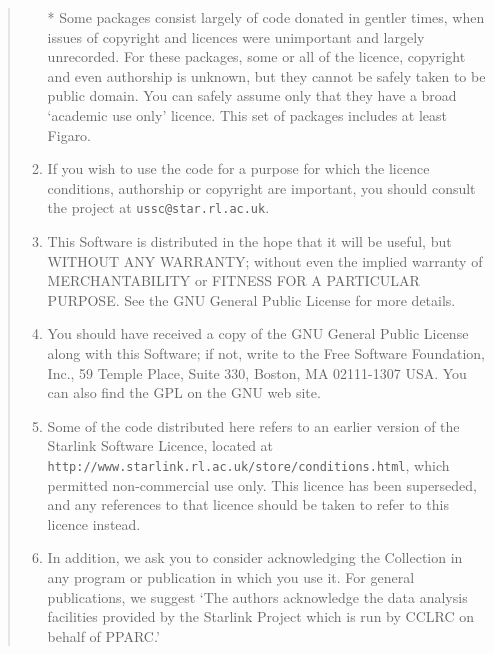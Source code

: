 \documentclass[twoside,11pt]{article}
\newcommand{\htmladdnormallink}[2]{#1}
\renewcommand{\_}{\texttt{\symbol{95}}}
\begin{document}
\begin{quote}
\begin{enumerate}
  * Some packages consist largely of code donated in gentler times,
    when issues of copyright and licences were unimportant and
    largely unrecorded.  For these packages, some or all of the
    licence, copyright and even authorship is unknown, but they
    cannot be safely taken to be public domain.  You can safely
    assume only that they have a broad `academic use only' licence.
    This set of packages includes at least Figaro.

\item If you wish to use the code for a purpose for which the licence
 conditions, authorship or copyright are important, you should 
 consult the project at \texttt{ussc@star.rl.ac.uk}.

\item This Software is distributed in the hope that it will be useful, but 
 WITHOUT ANY WARRANTY; without even the implied warranty of 
 MERCHANTABILITY or FITNESS FOR A PARTICULAR PURPOSE. See the GNU General
 Public License for more details.

\item You should have received a copy of the GNU General Public License along 
 with this Software; if not, write to the Free Software Foundation, Inc., 
 59 Temple Place, Suite 330, Boston, MA 02111-1307 USA. You can also find 
 the GPL on the GNU web site.
 
\item Some of the code distributed here refers to an earlier version of
 the Starlink Software Licence, located at
 \htmladdnormallink{\texttt{http://www.starlink.rl.ac.uk/store/conditions.html}}{http://www.starlink.rl.ac.uk/store/conditions.html}, 
 which permitted non-commercial use only.  This licence has been
 superseded, and any references to that licence should be taken to
 refer to this licence instead.

\item In addition, we ask you to consider acknowledging the Collection in any
 program or publication in which you use it.  For general publications,
 we suggest `The authors acknowledge the data analysis facilities
 provided by the Starlink Project which is run by CCLRC on behalf
 of PPARC.'
\end{enumerate}
\end{quote}
\end{document}
